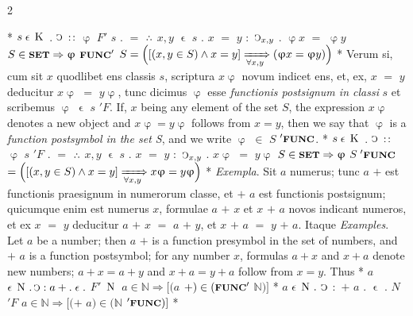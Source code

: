 \documentclass{book}
\newcommand{\C}{\mathop{\sbox0{$\displaystyle$$\reflectbox{C}$} %
\raisebox{-\height+\ht0-0.05cm}[\ht0][\dp0]{\scalebox{0.8}[0.8]{\copy0}}}\displaylimits} %
\newcommand{\pppNoSpace}{\leavevmode\lower0ex\hbox{.}\kern-0.1em\raise0.7ex\hbox{.}\kern-0.1em\lower0ex\hbox{.}} %
\newcommand{\smallIn}{\ensuremath{\mathrel{\epsilon}}}
\newcommand{\K}{\mathop{\thinspace \text{K} \thinspace}}
\newcommand{\N}{\mathop{\thinspace \text{N} \thinspace}}
\newcommand{\setOfSets}{\mathop{\text{{\footnotesize \textbf{SET}}}}}
\newcommand{\func}{\mathord{\text{{\footnotesize \textbf{FUNC}}}}}
\renewcommand{\rightarrow}{\Rightarrow}
\renewcommand{\xrightarrow}{\xRightarrow}
\newenvironment{translateTwoCol}
               { %
                 \columnratio{0.5, 0.5}
                 \begin{paracol}{2}
                 \newcommand{\LAT}{\switchcolumn[0]*}
                 \newcommand{\ENG}{\switchcolumn[1]}
               }
               { %
                 \let\ENG\undefined
                 \let\LAT\undefined
                 \end{paracol}
               }
\begin{document}
\begin{translateTwoCol}
\LAT
\hspace{1.06cm} $s \smallIn \K$ $.$ $\C$ $:\hspace{0.1em}:$ $\upvarphi$ $F'$ $s$ $.$ $=$ $\pppNoSpace$ $x,y$ $\smallIn$ $s$ $.$ $x$ $=$ $y$ $:$ $\C_{x,y}$ $.$ $\upvarphi x$ $=$ $\upvarphi y$
\ENG
\hspace{1.06cm} $S \in \setOfSets \rightarrow \upvarphi$ $\func'$ $S = \Big( [(x,y \in S) \wedge x = y] \xrightarrow[\forall x,y]{} ( \upvarphi x = \upvarphi y) \Big)$
\LAT
Verum si, cum sit $x$ quodlibet ens classis $s$, scriptura $x\upvarphi$ novum indicet ens, et, ex, $x$ $=$ $y$ deducitur $x\upvarphi$ $=$ $y\upvarphi$, tunc dicimus $\upvarphi$ esse \emph{functionis postsignum in classi} $s$ et scribemus $\upvarphi$ $\smallIn$ $s$ $'F$.
\ENG
If, $x$ being any element of the set $S$, the expression $x\upvarphi$ denotes a new object and $x\upvarphi = y\upvarphi$ follows from $x=y$, then we say that $\upvarphi$ is a \emph{function postsymbol in the set S}, and we write $\upvarphi$ $\in$ $S$ $'\func$.
\LAT
\hspace{1.06cm} $s \smallIn \K$ $.$ $\C$ $:\hspace{0.1em}:$ $\upvarphi$ $s$ $'F$ $.$ $=$ $\pppNoSpace$ $x,y$ $\smallIn$ $s$ $.$ $x$ $=$ $y$ $:$ $\C_{x,y}$ $.$ $x\upvarphi$ $=$ $y\upvarphi$
\ENG
\hspace{1.06cm} $S \in \setOfSets \rightarrow \upvarphi$ $S$ $'\func$ $= \Big( [(x,y \in S) \wedge x=y] \xrightarrow[\forall x,y]{} x\upvarphi=y\upvarphi \Big)$
\LAT
\emph{Exempla}. Sit $a$ numerus; tunc $a$ $+$ est functionis praesignum in numerorum classe, et $+$ $a$ est functionis postsignum; quicumque enim est numerus $x$, formulae $a$ $+$ $x$ et $x$ $+$ $a$ novos indicant numeros, et ex $x$ $=$ $y$ deducitur $a$ $+$ $x$ $=$ $a$ $+$ $y$, et $x$ $+$ $a$ $=$ $y$ $+$ $a$. Itaque
\ENG
\emph{Examples}. Let $a$ be a number; then $a$ $+$ is a function presymbol in the set of numbers, and $+$ $a$ is a function postsymbol; for any number $x$, formulas $a+x$ and $x+a$ denote new numbers; $a+x=a+y$ and $x+a=y+a$ follow from $x=y$. Thus 
\LAT
\hspace{1.06cm} $a$ $\smallIn \N . \C : a + . \smallIn .$ $F'$ $\N$
\ENG
\hspace{1.06cm} $a \in \mathbb{N} \rightarrow [(a$ $+) \in (\func'$ $\mathbb{N})]$
\LAT
\hspace{1.06cm} $a$ $\smallIn \N .$ $\C$ $:$ $+$ $a$ $.$ $\smallIn$ $.$ $N$ $'F$
\ENG
\hspace{1.06cm} $a \in \mathbb{N} \rightarrow [(+$ $a) \in (\mathbb{N}$ $'\func)]$
\LAT
\hfill
\ENG

\end{translateTwoCol}
\end{document}
